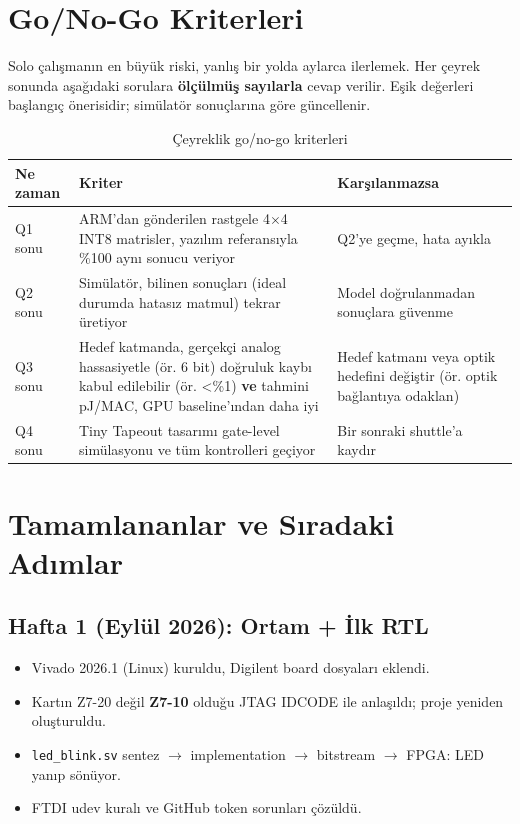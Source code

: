 \documentclass[11pt,a4paper]{article}
\begin{document}
\section{Go/No-Go Kriterleri}

Solo çalışmanın en büyük riski, yanlış bir yolda aylarca ilerlemek. Her çeyrek sonunda aşağıdaki sorulara \textbf{ölçülmüş sayılarla} cevap verilir. Eşik değerleri başlangıç önerisidir; simülatör sonuçlarına göre güncellenir.

\begin{table}[h!]
\centering
\small
\begin{tabular}{@{}p{1.6cm}p{6.4cm}p{6cm}@{}}
\toprule
\textbf{Ne zaman} & \textbf{Kriter} & \textbf{Karşılanmazsa} \\
\midrule
Q1 sonu & ARM'dan gönderilen rastgele 4$\times$4 INT8 matrisler, yazılım referansıyla \%100 aynı sonucu veriyor & Q2'ye geçme, hata ayıkla \\
Q2 sonu & Simülatör, bilinen sonuçları (ideal durumda hatasız matmul) tekrar üretiyor & Model doğrulanmadan sonuçlara güvenme \\
Q3 sonu & Hedef katmanda, gerçekçi analog hassasiyetle (ör. 6 bit) doğruluk kaybı kabul edilebilir (ör. \textless\%1) \textbf{ve} tahmini pJ/MAC, GPU baseline'ından daha iyi & Hedef katmanı veya optik hedefini değiştir (ör. optik bağlantıya odaklan) \\
Q4 sonu & Tiny Tapeout tasarımı gate-level simülasyonu ve tüm kontrolleri geçiyor & Bir sonraki shuttle'a kaydır \\
\bottomrule
\end{tabular}
\caption{Çeyreklik go/no-go kriterleri}
\end{table}

\section{Tamamlananlar ve Sıradaki Adımlar}

\subsection{Hafta 1 (Eylül 2026): Ortam + İlk RTL}

\begin{itemize}
    \item Vivado 2026.1 (Linux) kuruldu, Digilent board dosyaları eklendi.
    \item Kartın Z7-20 değil \textbf{Z7-10} olduğu JTAG IDCODE ile anlaşıldı; proje yeniden oluşturuldu.
    \item \texttt{led\_blink.sv} sentez $\rightarrow$ implementation $\rightarrow$ bitstream $\rightarrow$ FPGA: LED yanıp sönüyor.
    \item FTDI udev kuralı ve GitHub token sorunları çözüldü.
\end{itemize}
\end{document}
